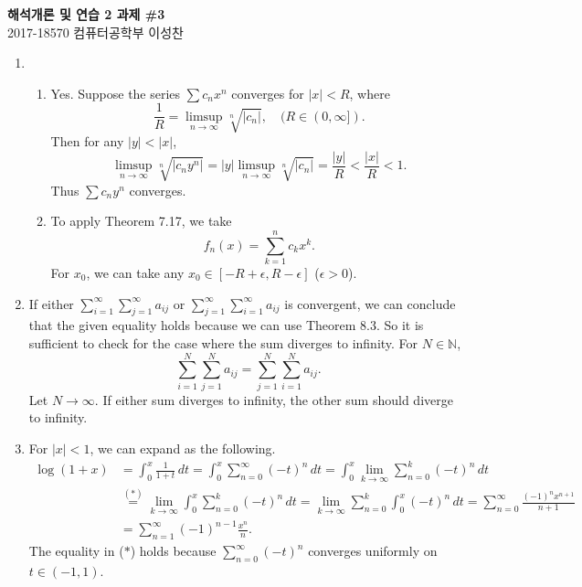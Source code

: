 \documentclass[12pt]{report}
\newcommand{\numl}[1]{\item[\large\textbf{\sffamily #1.}]}
\newcommand{\num}[1]{\item[\textbf{\sffamily #1}]}
\newcommand{\ds}{\displaystyle}
\newcommand{\abs}[1]{\left| #1 \right|}
\newcommand{\ra}{\rightarrow}
\newcommand{\mast}{\(\ast\)}
\newcommand{\N}{\mathbb{N}}
\renewcommand{\d}[1]{\,d{#1}}
\begin{document}
\begin{center}
    \textbf{\Large 해석개론 및 연습 2 과제 \#3}\\
    \large 2017-18570 컴퓨터공학부 이성찬
\end{center}
\begin{enumerate}

    \numl{1}
    \begin{enumerate}
        \num{(a)} Yes. Suppose the series \(\sum c_n x^n\) converges for \(\abs{x} < R\), where
        \[
            \frac{1}{R} = \limsup_{n\ra\infty} \sqrt[n]{\abs{c_n}}, \quad (R \in (0, \infty]).
        \]
        Then for any \(\abs{y} < \abs{x}\),
        \[
            \limsup_{n \ra \infty} \sqrt[n]{\abs{c_n y^n}} = \abs{y} \limsup_{n\ra\infty} \sqrt[n]{\abs{c_n}} = \frac{\abs{y}}{R} < \frac{\abs{x}}{R} < 1.
        \]
        Thus \(\sum c_n y^n\) converges.

        \num{(b)} To apply Theorem 7.17, we take
        \[
            f_n(x) = \sum_{k=1}^n c_k x^k.
        \]
        For \(x_0\), we can take any \(x_0 \in [-R + \epsilon, R - \epsilon]\) (\(\epsilon > 0\)).
    \end{enumerate}

    \numl{2} If either \(\ds \sum_{i=1}^\infty \sum_{j=1}^\infty a_{ij}\) or \(\ds \sum_{j=1}^\infty \sum_{i=1}^\infty a_{ij}\) is convergent, we can conclude that the given equality holds because we can use Theorem 8.3. So it is sufficient to check for the case where the sum diverges to infinity. For \(N \in \N\),
    \[
        \sum_{i=1}^N \sum_{j=1}^N a_{ij} = \sum_{j=1}^N \sum_{i=1}^N a_{ij}.
    \]
    Let \(N \ra \infty\). If either sum diverges to infinity, the other sum should diverge to infinity.

    \numl{3} For \(\abs{x} < 1\), we can expand as the following.
    \[
        \begin{aligned}
            \log (1 + x) & = \int_0^x \frac{1}{1 + t}\d{t} = \int_0^x \sum_{n=0}^\infty (-t)^n \d{t} = \int_0^x \lim_{k \ra \infty} \sum_{n=0}^k (-t)^n \d{t}                                                \\
                         & \overset{(\ast)}{=} \lim_{k \ra \infty} \int_0^x \sum_{n=0}^k (-t)^n \d{t} = \lim_{k \ra\infty} \sum_{n=0}^k \int_0^x (-t)^n \d{t} = \sum_{n=0}^\infty \frac{(-1)^n x^{n+1}}{n+1} \\
                         & = \sum_{n=1}^\infty (-1)^{n-1}\frac{x^n}{n}.
        \end{aligned}
    \]
    The equality in (\mast) holds because \(\sum_{n=0}^\infty (-t)^n\) converges uniformly on \(t \in (-1, 1)\).


\end{enumerate}
\end{document}

